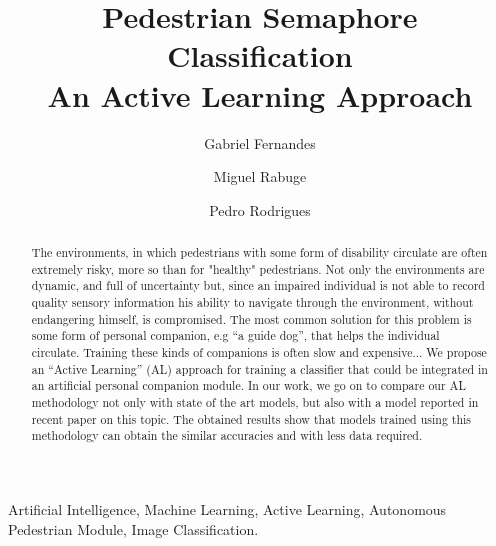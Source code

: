 \documentclass[journal, a4paper]{IEEEtran}
\begin{document}
\title{Pedestrian Semaphore Classification \\ An Active Learning Approach}
\author[1]{Gabriel Fernandes}
\author[2]{Miguel Rabuge}
\author[3]{Pedro Rodrigues}


\maketitle

\thispagestyle{plain}
\pagestyle{plain}

\begin{abstract}

The environments, in which pedestrians with some form of disability circulate are 
often extremely risky, more so than for "healthy" pedestrians. Not only the 
environments are dynamic, and full of uncertainty but, since an impaired 
individual is not able to record quality sensory information his ability to 
navigate through the environment, without endangering himself, is compromised.
The most common solution for this problem is some form of personal companion, 
e.g “a guide dog”, that helps the individual circulate. Training these kinds of 
companions is often slow and expensive... We propose an “Active Learning” (AL) 
approach for training a classifier that could be integrated in an artificial 
personal companion module. In our work, we go on to compare our AL methodology
not only with state of the art models, but also with a model reported in recent paper 
on this topic. The obtained results show that models trained using this 
methodology can obtain the similar accuracies and with less data required.

\end{abstract}

\begin{IEEEkeywords}

Artificial Intelligence, Machine Learning, Active Learning, Autonomous Pedestrian Module, 
Image Classification.

\end{IEEEkeywords}
\end{document}
